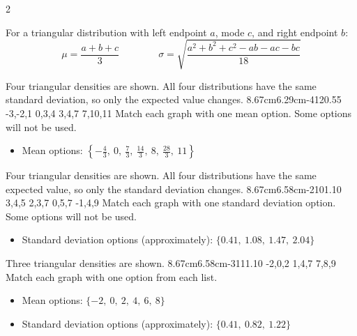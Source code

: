 \begin{multicols}{2}
		
		\vspace{-0.35cm}
		For a triangular distribution with left endpoint $a$, mode $c$, and right endpoint $b$:
		\[
		\mu=\frac{a+b+c}{3}
		\qquad \qquad
		\sigma=\sqrt{\frac{a^2+b^2+c^2-ab-ac-bc}{18}}
		\]
		
		\vspace{-0.35cm}
		Four triangular densities are shown. All four distributions have the same standard deviation, so only the expected value changes.
		\vspace{-0.7cm}
		\TriangularFourGraph
		{8.67cm}{6.29cm}{-4}{12}{0.55}
		{-3,-2,1}
		{0,3,4}
		{3,4,7}
		{7,10,11}
		Match each graph with one mean option. Some options will not be used.
		\begin{itemize}
			\item Mean options: $\left\{-\frac{4}{3},\ 0,\ \frac{7}{3},\ \frac{14}{3},\ 8,\ \frac{28}{3},\ 11\right\}$
		\end{itemize}
		
		\vspace{-0.35cm}
		Four triangular densities are shown. All four distributions have the same expected value, so only the standard deviation changes.
		\vspace{-0.7cm}
		\TriangularFourGraph
		{8.67cm}{6.58cm}{-2}{10}{1.10}
		{3,4,5}
		{2,3,7}
		{0,5,7}
		{-1,4,9}
		Match each graph with one standard deviation option. Some options will not be used.
		\begin{itemize}
			\item Standard deviation options (approximately): $\{0.41,\ 1.08,\ 1.47,\ 2.04\}$
		\end{itemize}
		
		\vspace{-0.35cm}
		Three triangular densities are shown.
		\vspace{-0.7cm}
		\TriangularThreeGraph
		{8.67cm}{6.58cm}{-3}{11}{1.10}
		{-2,0,2}
		{1,4,7}
		{7,8,9}
		Match each graph with one option from each list.
		\begin{itemize}
			\item Mean options: $\{-2, \ 0,\ 2,\ 4,\ 6 ,\ 8\}$
			\item Standard deviation options (approximately): $\{0.41,\ 0.82,\ 1.22\}$
		\end{itemize}
		

\end{multicols}
